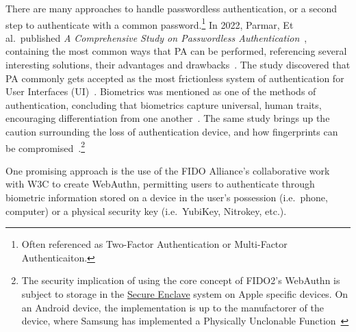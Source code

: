There are many approaches to handle passwordless authentication, or a second
step to authenticate with a common password.\footnote{
  Often referenced as Two-Factor Authentication or Multi-Factor Authenticaiton.
}
In 2022, Parmar, Et al.\ published
\textit{A Comprehensive Study on Passwordless Authentication}~\cite{parmar2022},
containing the most common ways that PA can be performed, referencing several
interesting solutions, their advantages and drawbacks~\cite{parmar2022}.
The study discovered that PA commonly gets accepted as the most frictionless
system of authentication for User Interfaces (UI)~\cite{parmar2022}.
Biometrics was mentioned as one of the methods of authentication, concluding
that biometrics capture universal, human traits, encouraging differentiation
from one another~\cite{parmar2022}.
The same study brings up the caution surrounding the loss of authentication
device, and how fingerprints can be compromised~\cite{parmar2022}.\footnote{
  The security implication of using the core concept of FIDO2's WebAuthn is
  subject to storage in the
  \href{https://support.apple.com/en-gb/guide/security/sec59b0b31ff/web}{Secure Enclave}
  system on Apple specific devices. On an Android device, the implementation
  is up to the manufactorer of the device, where Samsung has implemented a
  Physically Unclonable Function~\cite{lee2021samsung}
}

One promising approach is the use of the FIDO Alliance's collaborative work with
W3C to create WebAuthn, permitting users to authenticate through biometric
information stored on a device in the user's possession (i.e.\ phone, computer)
or a physical security
key (i.e.\ YubiKey, Nitrokey, etc.).
